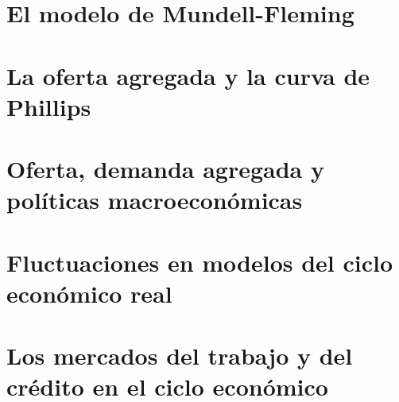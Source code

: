 \documentclass{article}
\numberwithin{figure}{section}
\begin{document}
\section{El modelo de Mundell-Fleming}
    
    
    
    
    
    
    
    
	
	
	
	
	
	
	
	


\section{La oferta agregada y la curva de Phillips}
	

\section{Oferta, demanda agregada y políticas macroeconómicas}
	
	
	
	
	

\section{Fluctuaciones en modelos del ciclo económico real}

\section{Los mercados del trabajo y del crédito en el ciclo económico}
	
	
	
	
	
	
	
	
	
	    
	
\end{document}
